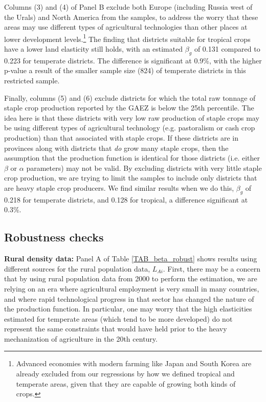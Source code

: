 \documentclass[11pt]{article}
\begin{document}
Columns (3) and (4) of Panel B exclude both Europe (including Russia west of the Urals) and North America from the samples, to address the worry that these areas may use different types of agricultural technologies than other places at lower development levels.\footnote{Advanced economies with modern farming like Japan and South Korea are already excluded from our regressions by how we defined tropical and temperate areas, given that they are capable of growing both kinds of crops.} The finding that districts suitable for tropical crops have a lower land elasticity still holds, with an estimated $\beta_g$ of 0.131 compared to 0.223 for temperate districts. The difference is significant at 0.9\%, with the higher p-value a result of the smaller sample size (824) of temperate districts in this restricted sample.

Finally, columns (5) and (6) exclude districts for which the total raw tonnage of staple crop production reported by the GAEZ is below the 25th percentile. The idea here is that these districts with very low raw production of staple crops may be using different types of agricultural technology (e.g. pastoralism or cash crop production) than that associated with staple crops. If these districts are in provinces along with districts that \textit{do} grow many staple crops, then the assumption that the production function is identical for those districts (i.e. either $\beta$ or $\alpha$ parameters) may not be valid. By excluding districts with very little staple crop production, we are trying to limit the samples to include only districts that are heavy staple crop producers. We find similar results when we do this, $\beta_g$ of 0.218 for temperate districts, and 0.128 for tropical, a difference significant at 0.3\%.

\subsection{Robustness checks}
\noindent\textbf{Rural density data:} Panel A of Table \ref{TAB_beta_robust} shows results using different sources for the rural population data, $L_{Ai}$. First, there may be a concern that by using rural population data from 2000 to perform the estimation, we are relying on an era where agricultural employment is very small in many countries, and where rapid technological progress in that sector has changed the nature of the production function. In particular, one may worry that the high elasticities estimated for temperate areas (which tend to be more developed) do not represent the same constraints that would have held prior to the heavy mechanization of agriculture in the 20th century.
\end{document}
